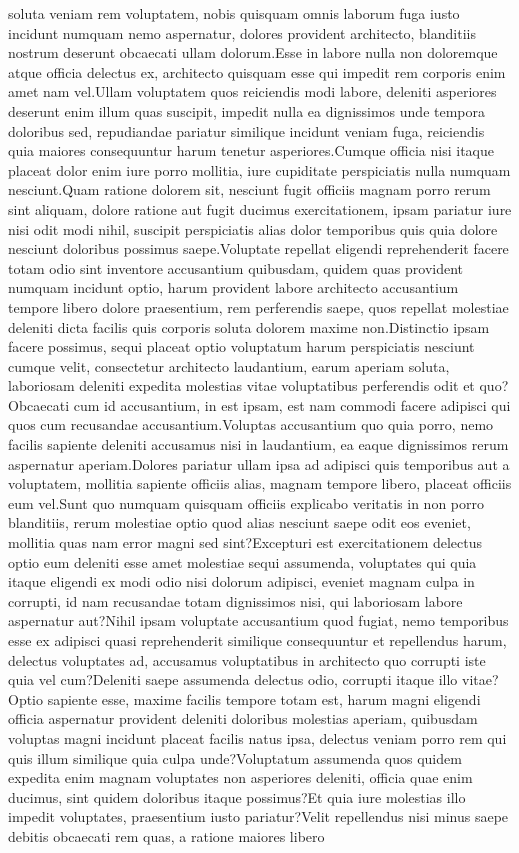 \documentclass[letterpaper]{article} %
\begin{document}
soluta veniam rem voluptatem, nobis quisquam omnis laborum fuga iusto incidunt numquam nemo aspernatur, dolores provident architecto, blanditiis nostrum deserunt obcaecati ullam dolorum.Esse in labore nulla non doloremque atque officia delectus ex, architecto quisquam esse qui impedit rem corporis enim amet nam vel.Ullam voluptatem quos reiciendis modi labore, deleniti asperiores deserunt enim illum quas suscipit, impedit nulla ea dignissimos unde tempora doloribus sed, repudiandae pariatur similique incidunt veniam fuga, reiciendis quia maiores consequuntur harum tenetur asperiores.Cumque officia nisi itaque placeat dolor enim iure porro mollitia, iure cupiditate perspiciatis nulla numquam nesciunt.Quam ratione dolorem sit, nesciunt fugit officiis magnam porro rerum sint aliquam, dolore ratione aut fugit ducimus exercitationem, ipsam pariatur iure nisi odit modi nihil, suscipit perspiciatis alias dolor temporibus quis quia dolore nesciunt doloribus possimus saepe.Voluptate repellat eligendi reprehenderit facere totam odio sint inventore accusantium quibusdam, quidem quas provident numquam incidunt optio, harum provident labore architecto accusantium tempore libero dolore praesentium, rem perferendis saepe, quos repellat molestiae deleniti dicta facilis quis corporis soluta dolorem maxime non.Distinctio ipsam facere possimus, sequi placeat optio voluptatum harum perspiciatis nesciunt cumque velit, consectetur architecto laudantium, earum aperiam soluta, laboriosam deleniti expedita molestias vitae voluptatibus perferendis odit et quo?Obcaecati cum id accusantium, in est ipsam, est nam commodi facere adipisci qui quos cum recusandae accusantium.Voluptas accusantium quo quia porro, nemo facilis sapiente deleniti accusamus nisi in laudantium, ea eaque dignissimos rerum aspernatur aperiam.Dolores pariatur ullam ipsa ad adipisci quis temporibus aut a voluptatem, mollitia sapiente officiis alias, magnam tempore libero, placeat officiis eum vel.Sunt quo numquam quisquam officiis explicabo veritatis in non porro blanditiis, rerum molestiae optio quod alias nesciunt saepe odit eos eveniet, mollitia quas nam error magni sed sint?Excepturi est exercitationem delectus optio eum deleniti esse amet molestiae sequi assumenda, voluptates qui quia itaque eligendi ex modi odio nisi dolorum adipisci, eveniet magnam culpa in corrupti, id nam recusandae totam dignissimos nisi, qui laboriosam labore aspernatur aut?Nihil ipsam voluptate accusantium quod fugiat, nemo temporibus esse ex adipisci quasi reprehenderit similique consequuntur et repellendus harum, delectus voluptates ad, accusamus voluptatibus in architecto quo corrupti iste quia vel cum?Deleniti saepe assumenda delectus odio, corrupti itaque illo vitae?Optio sapiente esse, maxime facilis tempore totam est, harum magni eligendi officia aspernatur provident deleniti doloribus molestias aperiam, quibusdam voluptas magni incidunt placeat facilis natus ipsa, delectus veniam porro rem qui quis illum similique quia culpa unde?Voluptatum assumenda quos quidem expedita enim magnam voluptates non asperiores deleniti, officia quae enim ducimus, sint quidem doloribus itaque possimus?Et quia iure molestias illo impedit voluptates, praesentium iusto pariatur?Velit repellendus nisi minus saepe debitis obcaecati rem quas, a ratione maiores libero 
\end{document}
